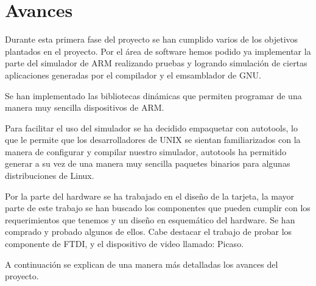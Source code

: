 \chapter{Avances}

Durante esta primera fase del proyecto se han cumplido varios de los objetivos plantados en el proyecto. Por el \'area de software hemos podido ya implementar la parte del simulador de ARM realizando pruebas y logrando simulación de ciertas aplicaciones generadas por el compilador y el emsamblador de GNU.\medskip

Se han implementado las bibliotecas din\'amicas que permiten programar de una manera muy sencilla dispositivos de ARM.\medskip

Para facilitar el uso del simulador se ha decidido empaquetar con autotools, lo que le permite que los desarrolladores de UNIX se sientan familiarizados con la manera de configurar y compilar nuestro simulador, autotools ha permitido generar a su vez de una manera muy sencilla paquetes binarios para algunas distribuciones de Linux.\medskip

Por la parte del hardware se ha trabajado en el dise\~no de la tarjeta, la mayor parte de este trabajo se han buscado los componentes que pueden cumplir con los requerimientos que tenemos y un diseño en esquem\'atico del hardware. Se han comprado y probado algunos de ellos. Cabe destacar el trabajo de probar los componente de FTDI, y el dispositivo de video llamado: Picaso.\medskip

A continuaci\'on se explican de una manera m\'as detalladas los avances del proyecto.

